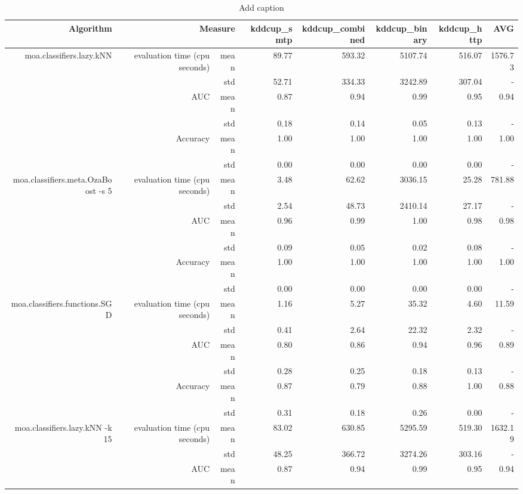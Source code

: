 \documentclass{article}
\begin{document}
\begin{table}[htbp]
\caption{Add caption}\begin{tabular}{rrrrrrrr}
\toprule
Algorithm & \multicolumn{2}{r}{Measure}& kddcup_smtp& kddcup_combined& kddcup_binary& kddcup_http& AVG\\
\midrule
\multirow{6}[6]{*}{moa.classifiers.lazy.kNN}&\multirow{2}[4]{*}{evaluation time (cpu seconds)} & mean & 89.77 & 593.32 & 5107.74 & 516.07& 1576.73\\
 & & std & 52.71 & 334.33 & 3242.89 & 307.04 & -\\
&\multirow{2}[4]{*}{AUC} & mean & 0.87 & 0.94 & 0.99 & 0.95& 0.94\\
 & & std & 0.18 & 0.14 & 0.05 & 0.13 & -\\
&\multirow{2}[4]{*}{Accuracy} & mean & 1.00 & 1.00 & 1.00 & 1.00& 1.00\\
 & & std & 0.00 & 0.00 & 0.00 & 0.00 & -\\
\multirow{6}[6]{*}{moa.classifiers.meta.OzaBoost -s 5}&\multirow{2}[4]{*}{evaluation time (cpu seconds)} & mean & 3.48 & 62.62 & 3036.15 & 25.28& 781.88\\
 & & std & 2.54 & 48.73 & 2410.14 & 27.17 & -\\
&\multirow{2}[4]{*}{AUC} & mean & 0.96 & 0.99 & 1.00 & 0.98& 0.98\\
 & & std & 0.09 & 0.05 & 0.02 & 0.08 & -\\
&\multirow{2}[4]{*}{Accuracy} & mean & 1.00 & 1.00 & 1.00 & 1.00& 1.00\\
 & & std & 0.00 & 0.00 & 0.00 & 0.00 & -\\
\multirow{6}[6]{*}{moa.classifiers.functions.SGD}&\multirow{2}[4]{*}{evaluation time (cpu seconds)} & mean & 1.16 & 5.27 & 35.32 & 4.60& 11.59\\
 & & std & 0.41 & 2.64 & 22.32 & 2.32 & -\\
&\multirow{2}[4]{*}{AUC} & mean & 0.80 & 0.86 & 0.94 & 0.96& 0.89\\
 & & std & 0.28 & 0.25 & 0.18 & 0.13 & -\\
&\multirow{2}[4]{*}{Accuracy} & mean & 0.87 & 0.79 & 0.88 & 1.00& 0.88\\
 & & std & 0.31 & 0.18 & 0.26 & 0.00 & -\\
\multirow{6}[6]{*}{moa.classifiers.lazy.kNN -k 15}&\multirow{2}[4]{*}{evaluation time (cpu seconds)} & mean & 83.02 & 630.85 & 5295.59 & 519.30& 1632.19\\
 & & std & 48.25 & 366.72 & 3274.26 & 303.16 & -\\
&\multirow{2}[4]{*}{AUC} & mean & 0.87 & 0.94 & 0.99 & 0.95& 0.94\\

\end{tabular}
\end{table}
\end{document}
